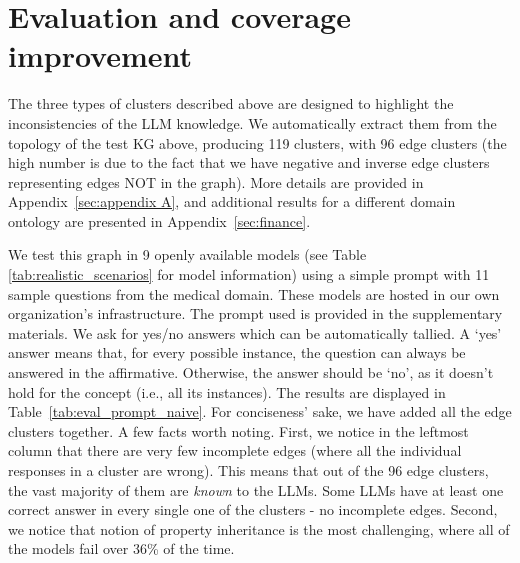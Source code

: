 \documentclass{article} %
\begin{document}
\section{Evaluation and coverage improvement} 
\label{sec:eval}

The three types of clusters described above are designed to highlight the inconsistencies of the LLM knowledge. We automatically extract them from the topology of the test KG above, producing 119 clusters, with 96 edge clusters (the high number is due to the fact that we have negative and inverse edge clusters representing edges NOT in the graph). More details are provided in Appendix~\ref{sec:appendix A}, and additional results for a different domain ontology are presented in Appendix~\ref{sec:finance}.

We test this graph in 9 openly available models 
(see Table \ref{tab:realistic_scenarios} for model information)
using a simple prompt with 11 sample questions from the medical domain. These models are hosted in our own organization's infrastructure. The prompt used is provided in the supplementary materials. We ask for yes/no answers which can be automatically tallied. A `yes' answer means that, for every possible instance, the question can always be answered in the affirmative. Otherwise, the answer should be `no', as it doesn't hold for the concept (i.e., all its instances). The results are displayed in Table~\ref{tab:eval_prompt_naive}. For conciseness' sake, we have added all the edge clusters together. A few facts worth noting. First, we notice in the leftmost column that there are very few incomplete edges (where all the individual responses in a cluster are wrong). This means that out of the 96 edge clusters, the vast majority of them are \textit{known} to the LLMs. Some LLMs have at least one correct answer in every single one of the clusters - no incomplete edges.  Second, we notice that notion of property inheritance is the most challenging, where all of the models fail over 36\% of the time. 
\end{document}
